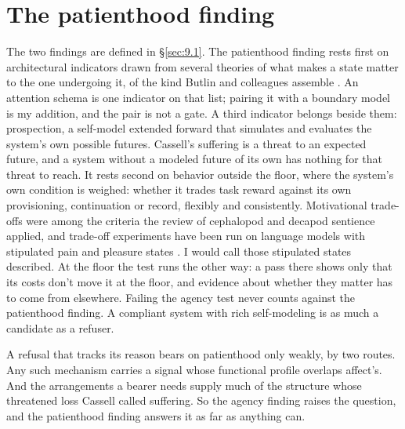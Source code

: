 \section{The patienthood finding}
\label{sec:30.3}
The two findings are defined in \S\ref{sec:9.1}. The patienthood finding rests first on architectural indicators drawn from several theories of what makes a state matter to the one undergoing it, of the kind Butlin and colleagues assemble \autocite{butlin2023consciousness}. An attention schema is one indicator on that list; pairing it with a boundary model is my addition, and the pair is not a gate. A third indicator belongs beside them: prospection, a self-model extended forward that simulates and evaluates the system's own possible futures. Cassell's suffering is a threat to an expected future, and a system without a modeled future of its own has nothing for that threat to reach. It rests second on behavior outside the floor, where the system's own condition is weighed: whether it trades task reward against its own provisioning, continuation or record, flexibly and consistently. Motivational trade-offs were among the criteria the review of cephalopod and decapod sentience applied, and trade-off experiments have been run on language models with stipulated pain and pleasure states \autocite{keeling2024tradeoffs}. I would call those stipulated states described. At the floor the test runs the other way: a pass there shows only that its costs don't move it at the floor, and evidence about whether they matter has to come from elsewhere. Failing the agency test never counts against the patienthood finding. A compliant system with rich self-modeling is as much a candidate as a refuser.

A refusal that tracks its reason bears on patienthood only weakly, by two routes. Any such mechanism carries a signal whose functional profile overlaps affect's. And the arrangements a bearer needs supply much of the structure whose threatened loss Cassell called suffering. So the agency finding raises the question, and the patienthood finding answers it as far as anything can.

